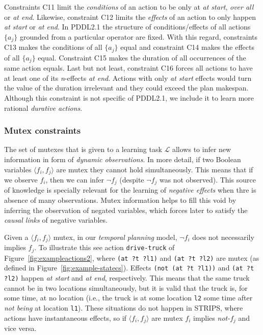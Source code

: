 \documentclass{ecai}
\newcommand{\tup}[1]{{\langle #1 \rangle}}
\begin{document}
Constraints C11 limit the {\em conditions} of an action to be only at \emph{at start}, \emph{over all} or \emph{at end}. Likewise, constraint C12 limits the {\em effects} of an action to only happen \emph{at start} or \emph{at end}. In PDDL2.1 the structure of conditions/effects of all actions $\{a_j\}$ grounded from a particular operator are fixed. With this regard, constraints C13 makes the conditions of all $\{a_j\}$ equal and constraint C14 makes the effects of all $\{a_j\}$ equal. Constraint C15 makes the duration of all occurrences of the same action equals. Last but not least, constraint C16 forces all actions to have at least one of its \textit{n}-effects \textit{at end}. Actions with only \textit{at start} effects would turn the value of the duration irrelevant and they could exceed the plan makespan. Although this constraint is not specific of PDDL2.1, we include it to learn more rational {\em durative actions}.


\subsubsection{Mutex constraints}
The set of mutexes that is given to a learning task $\mathcal{L}$ allows to infer new information in form of {\em dynamic observations}. In more detail, if two Boolean variables $\tup{f_i, f_j}$ are mutex they cannot hold simultaneously. This means that if we observe $f_i$, then we can infer $\neg f_j$ (despite $\neg f_j$ was not observed). This source of knowledge is specially relevant for the learning of {\em negative effects} when thre is absence of many observations. Mutex information helps to fill this void by inferring the observation of negated variables, which forces later to satisfy the {\em causal links} of negative variables. 

Given a $\tup{f_i, f_j}$ mutex, in our {\em temporal planning} model, $\neg f_i$ does not necessarily implies $f_j$. To illustrate this see action \texttt{drive-truck} of Figure~\ref{fig:exampleactions2}, where \texttt{(at ?t ?l1)} and \texttt{(at ?t ?l2)} are mutex (as defined in Figure~\ref{fig:example-statecs}). Effects \texttt{(not (at ?t ?l1))} and \texttt{(at ?t ?l2)} happen \textit{at start} and \textit{at end}, respectively. This means that the same truck cannot be in two locations simultaneously, but it is valid that the truck is, for some time, at no location (i.e., the truck is at some location \texttt{l2} some time after \textit{not being} at location \texttt{l1}). These situations do not happen in STRIPS, where actions have instantaneous effects, so if $\tup{f_i, f_j}$ are mutex $f_i$ implies \textit{not-}$f_j$ and vice versa.
\end{document}

